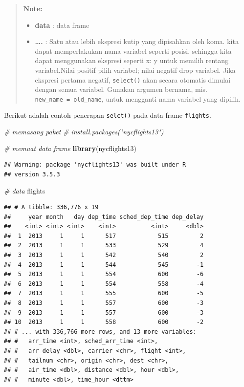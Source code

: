 \documentclass[]{book}
\newenvironment{Shaded}{\begin{snugshade}}{\end{snugshade}}
\newcommand{\KeywordTok}[1]{\textcolor[rgb]{0.13,0.29,0.53}{\textbf{#1}}}
\newcommand{\CommentTok}[1]{\textcolor[rgb]{0.56,0.35,0.01}{\textit{#1}}}
\newcommand{\NormalTok}[1]{#1}
\providecommand{\tightlist}{%
  \setlength{\itemsep}{0pt}\setlength{\parskip}{0pt}}
\begin{document}
\begin{quote}
\textbf{Note: }

\begin{itemize}
\tightlist
\item
  \textbf{data} : data frame
\item
  \textbf{\ldots{}.} : Satu atau lebih ekspresi kutip yang dipisahkan
  oleh koma. kita dapat memperlakukan nama variabel seperti posisi,
  sehingga kita dapat menggunakan ekspresi seperti x: y untuk memilih
  rentang variabel.Nilai positif pilih variabel; nilai negatif drop
  variabel. Jika ekspresi pertama negatif, \texttt{select()} akan secara
  otomatis dimulai dengan semua variabel. Gunakan argumen bernama, mis.
  \texttt{new\_name\ =\ old\_name}, untuk mengganti nama variabel yang
  dipilih.
\end{itemize}
\end{quote}

Berikut adalah contoh penerapan \texttt{selct()} pada data frame
\texttt{flights}.

\begin{Shaded}
\begin{Highlighting}[]
\CommentTok{# memasang paket}
\CommentTok{# install.packages("nycflights13")}

\CommentTok{# memuat data frame}
\KeywordTok{library}\NormalTok{(nycflights13)}
\end{Highlighting}
\end{Shaded}

\begin{verbatim}
## Warning: package 'nycflights13' was built under R
## version 3.5.3
\end{verbatim}

\begin{Shaded}
\begin{Highlighting}[]
\CommentTok{# data}
\NormalTok{flights}
\end{Highlighting}
\end{Shaded}

\begin{verbatim}
## # A tibble: 336,776 x 19
##     year month   day dep_time sched_dep_time dep_delay
##    <int> <int> <int>    <int>          <int>     <dbl>
##  1  2013     1     1      517            515         2
##  2  2013     1     1      533            529         4
##  3  2013     1     1      542            540         2
##  4  2013     1     1      544            545        -1
##  5  2013     1     1      554            600        -6
##  6  2013     1     1      554            558        -4
##  7  2013     1     1      555            600        -5
##  8  2013     1     1      557            600        -3
##  9  2013     1     1      557            600        -3
## 10  2013     1     1      558            600        -2
## # ... with 336,766 more rows, and 13 more variables:
## #   arr_time <int>, sched_arr_time <int>,
## #   arr_delay <dbl>, carrier <chr>, flight <int>,
## #   tailnum <chr>, origin <chr>, dest <chr>,
## #   air_time <dbl>, distance <dbl>, hour <dbl>,
## #   minute <dbl>, time_hour <dttm>
\end{verbatim}
\end{document}
